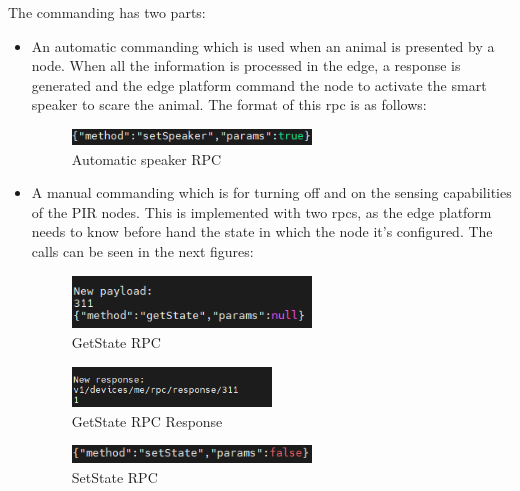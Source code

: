 The commanding has two parts:
\begin{itemize}
    \item An automatic commanding which is used when an animal is presented by a node. When all the information is processed in the edge, a response is 
    generated and the edge platform command the node to activate the smart speaker to scare the animal. The format of this \acrshort{rpc} is as follows:
    \begin{figure}[H]
        \centering
        \includegraphics[width=0.6\textwidth]{./images/8/speaker.png}
        \caption{Automatic speaker RPC}
        \label{fig:speakerRPC}
    \end{figure}
    \item A manual commanding which is for turning off and on the sensing capabilities of the PIR nodes. This is implemented with two \acrshort{rpc}s, as the edge 
    platform needs to know before hand the state in which the node it's configured. The calls can be seen in the next figures:

    \begin{figure}[H]
        \centering
        \includegraphics[width=0.6\textwidth]{./images/8/getStateRPC.png}
        \caption{GetState RPC}
        \label{fig:getStateRPC}
    \end{figure}

    \begin{figure}[H]
        \centering
        \includegraphics[width=0.5\textwidth]{./images/8/getStateRPCResponse.png}
        \caption{GetState RPC Response}
        \label{fig:getStateRPCResponse}
    \end{figure}

    \begin{figure}[H]
        \centering
        \includegraphics[width=0.6\textwidth]{./images/8/setState.png}
        \caption{SetState RPC}
        \label{fig:setStateRPC}
    \end{figure}

\end{itemize}
\clearpage
